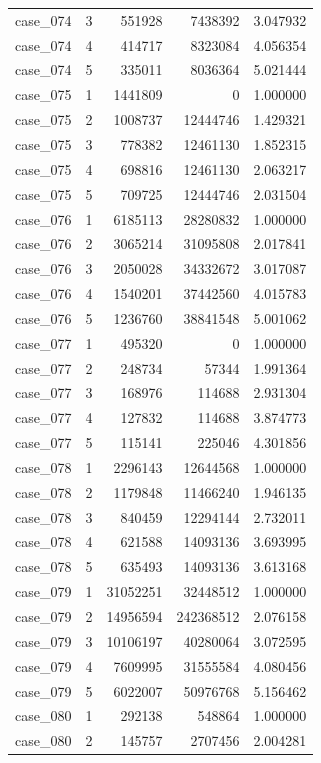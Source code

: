 \begin{longtable}{lrrrr}
case\_074 & 3 & 551928 & 7438392 & 3.047932 \\
case\_074 & 4 & 414717 & 8323084 & 4.056354 \\
case\_074 & 5 & 335011 & 8036364 & 5.021444 \\
case\_075 & 1 & 1441809 & 0 & 1.000000 \\
case\_075 & 2 & 1008737 & 12444746 & 1.429321 \\
case\_075 & 3 & 778382 & 12461130 & 1.852315 \\
case\_075 & 4 & 698816 & 12461130 & 2.063217 \\
case\_075 & 5 & 709725 & 12444746 & 2.031504 \\
case\_076 & 1 & 6185113 & 28280832 & 1.000000 \\
case\_076 & 2 & 3065214 & 31095808 & 2.017841 \\
case\_076 & 3 & 2050028 & 34332672 & 3.017087 \\
case\_076 & 4 & 1540201 & 37442560 & 4.015783 \\
case\_076 & 5 & 1236760 & 38841548 & 5.001062 \\
case\_077 & 1 & 495320 & 0 & 1.000000 \\
case\_077 & 2 & 248734 & 57344 & 1.991364 \\
case\_077 & 3 & 168976 & 114688 & 2.931304 \\
case\_077 & 4 & 127832 & 114688 & 3.874773 \\
case\_077 & 5 & 115141 & 225046 & 4.301856 \\
case\_078 & 1 & 2296143 & 12644568 & 1.000000 \\
case\_078 & 2 & 1179848 & 11466240 & 1.946135 \\
case\_078 & 3 & 840459 & 12294144 & 2.732011 \\
case\_078 & 4 & 621588 & 14093136 & 3.693995 \\
case\_078 & 5 & 635493 & 14093136 & 3.613168 \\
case\_079 & 1 & 31052251 & 32448512 & 1.000000 \\
case\_079 & 2 & 14956594 & 242368512 & 2.076158 \\
case\_079 & 3 & 10106197 & 40280064 & 3.072595 \\
case\_079 & 4 & 7609995 & 31555584 & 4.080456 \\
case\_079 & 5 & 6022007 & 50976768 & 5.156462 \\
case\_080 & 1 & 292138 & 548864 & 1.000000 \\
case\_080 & 2 & 145757 & 2707456 & 2.004281 \\

\end{longtable}
